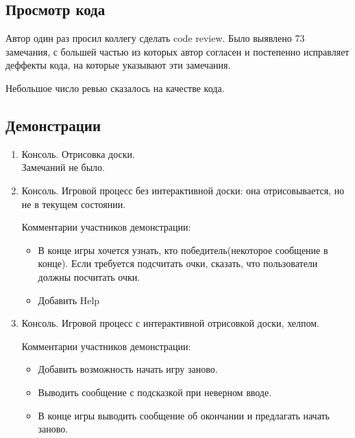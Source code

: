 \subsection*{Просмотр кода}

Автор один раз просил коллегу сделать code review. Было выявлено 73 замечания, с большей частью из которых автор согласен и постепенно исправляет деффекты кода, на которые указывают эти замечания.

Небольшое число ревью сказалось на качестве кода.

\subsection*{Демонстрации}

\begin{enumerate}

\item Консоль. Отрисовка доски.\\
	Замечаний не было.

\item Консоль. Игровой процесс без интерактивной доски: она отрисовывается, но не в текущем состоянии.

Комментарии участников демонстрации:

\begin{itemize}
	\item В конце игры хочется узнать, кто победитель(некоторое сообщение в конце). Если требуется подсчитать очки, сказать, что пользователи должны посчитать очки.
	\item Добавить Help
\end{itemize}

\item Консоль. Игровой процесс с интерактивной отрисовкой доски, хелпом.

Комментарии участников демонстрации:

\begin{itemize}
	\item Добавить возможность начать игру заново.
	\item Выводить сообщение с подсказкой при неверном вводе.
	\item В конце игры выводить сообщение об окончании и предлагать начать заново.
\end{itemize}

\end{enumerate}

